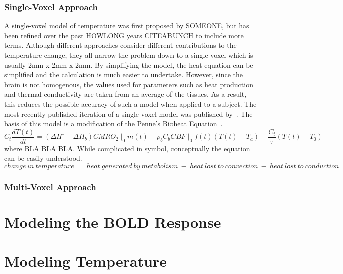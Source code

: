     \subsubsection{\label{sss:singlevoxel}Single-Voxel Approach}
    A single-voxel model of temperature was first proposed by SOMEONE, but has been refined over the past HOWLONG years CITEABUNCH to include more terms.  Although different approaches consider different contributions to the temperature change, they all narrow the problem down to a single voxel which is usually 2mm x 2mm x 2mm.  By simplifying the model, the heat equation can be simplified and the calculation is much easier to undertake.  However, since the brain is not homogenous, the values used for parameters such as heat production and thermal conductivity are taken from an average of the tissues.  As a result, this reduces the possible accuracy of such a model when applied to a subject.
    The most recently published iteration of a single-voxel model was published by~\citet{sotero2011}.  The basis of this model is a modification of the Penne's Bioheat Equation~\citep{pennes}.
    \begin{equation}
      C_t \frac{dT(t)}{dt} = (\Delta H^{\circ}-\Delta H_{b}) CMRO_{2}\mid_{0} m(t) - \rho_{b} C_{b} CBF\mid_{0} f(t) (T(t) - T_{a}) - \frac{C_{t}}{\tau} (T(t)-T_{0})
    \end{equation}
    where BLA BLA BLA.  While complicated in symbol, conceptually the equation can be easily understood.
    \begin{equation}    change~in~temperature~=~heat~generated~by~metabolism~-~heat~lost~to~convection~-~heat~lost~to~conduction
    \end{equation}
    \subsubsection{\label{sss:multivoxel}Multi-Voxel Approach}
  


\section{Modeling the BOLD Response}

\section{Modeling Temperature}
